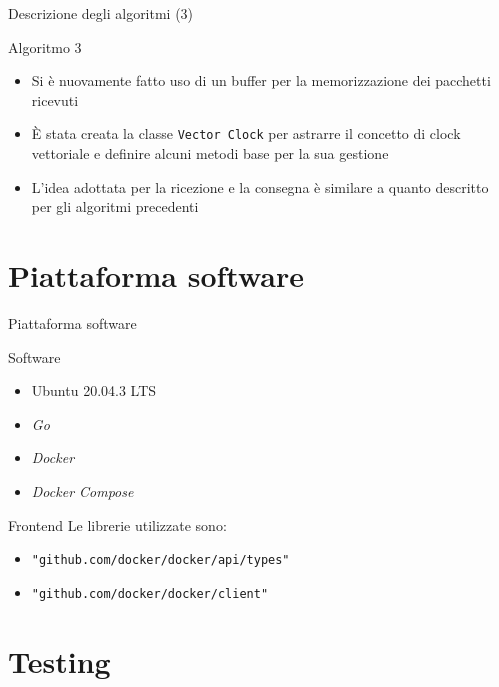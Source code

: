 \documentclass[
	usepdftitle=false,
	xcolor={table, dvipsnames},
	hyperref={
		pdftitle={Multicast totalmente e causalmente ordinato in Go},
    	pdfauthor={A. Chillotti}
    }
]{beamer}
\begin{document}
\begin{frame}{Descrizione degli algoritmi (3)}

\begin{block}{Algoritmo 3}
\begin{itemize}
\item Si è nuovamente fatto uso di un buffer per la memorizzazione dei pacchetti ricevuti
\item È stata creata la classe \texttt{Vector Clock} per astrarre il concetto di clock vettoriale e definire alcuni metodi base per la sua gestione
\item L'idea adottata per la ricezione e la consegna è similare a quanto descritto per gli algoritmi precedenti
\end{itemize} 
\end{block}

\end{frame}

\section{Piattaforma software}
\begin{frame}{Piattaforma software}

\begin{block}{Software}
\begin{itemize}
\item Ubuntu 20.04.3 LTS
\item \textit{Go}
\item \textit{Docker}
\item \textit{Docker Compose}
\end{itemize}
\end{block}

\begin{block}{Frontend}
Le librerie utilizzate sono:
\begin{itemize}
\item \texttt{"github.com/docker/docker/api/types"}
\item \texttt{"github.com/docker/docker/client"}
\end{itemize}
\end{block}

\end{frame}

\section{Testing}
\end{document}
